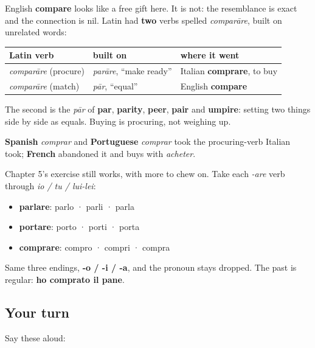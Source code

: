 \begin{cousinweb}
English \textbf{compare} looks like a free gift here. It is not: the resemblance is exact and the connection is nil. Latin had \textbf{two} verbs spelled \emph{comparāre}, built on unrelated words:

\noindent
\begin{tabularx}{\linewidth}{@{}>{\raggedright\arraybackslash}X>{\raggedright\arraybackslash}X>{\raggedright\arraybackslash}X@{}}
\toprule
\textbf{Latin verb} & \textbf{built on} & \textbf{where it went} \\
\midrule
\emph{comparāre} (procure) & \emph{parāre}, \textquotedblleft{}make ready\textquotedblright{} & Italian \textbf{comprare}, to buy \\
\emph{comparāre} (match) & \emph{pār}, \textquotedblleft{}equal\textquotedblright{} & English \textbf{compare} \\
\bottomrule
\end{tabularx}

The second is the \emph{pār} of \textbf{par}, \textbf{parity}, \textbf{peer}, \textbf{pair} and \textbf{umpire}: setting two things side by side as equals. Buying is procuring, not weighing up.

\textbf{Spanish} \emph{comprar} and \textbf{Portuguese} \emph{comprar} took the procuring-verb Italian took; \textbf{French} abandoned it and buys with \emph{acheter}.
\end{cousinweb}

\begin{grammarlens}[title={Grammar Lens: run them together}]
Chapter 5's exercise still works, with more to chew on. Take each \emph{-are} verb through \emph{io / tu / lui-lei}:

\begin{itemize}
\raggedright
  \item \textbf{parlare}: parlo · parli · parla
  \item \textbf{portare}: porto · porti · porta
  \item \textbf{comprare}: compro · compri · compra
\end{itemize}

Same three endings, \textbf{-o / -i / -a}, and the pronoun stays dropped. The past is regular: \textbf{ho comprato il pane}.
\end{grammarlens}

\subsection*{Your turn}
Say these aloud:

